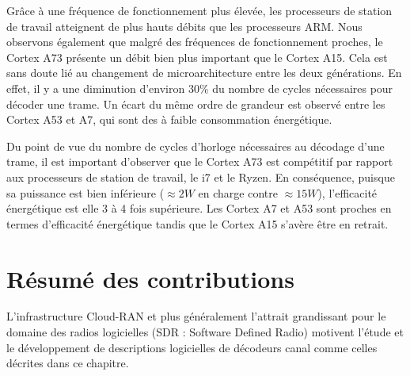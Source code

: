 Grâce à une fréquence de fonctionnement plus élevée, les processeurs de station de travail atteignent de plus hauts débits que les processeurs ARM. Nous observons également que malgré des fréquences de fonctionnement proches, le Cortex A73 présente un débit bien plus important que le Cortex A15. Cela est sans doute lié au changement de microarchitecture entre les deux générations. En effet, il y a une diminution d'environ 30\% du nombre de cycles nécessaires pour décoder une trame. Un écart du même ordre de grandeur est observé entre les Cortex A53 et A7, qui sont des \coeurs à faible consommation énergétique.

Du point de vue du nombre de cycles d'horloge nécessaires au décodage d'une trame, il est important d'observer que le Cortex A73 est compétitif par rapport aux processeurs de station de travail, le i7 et le Ryzen. En conséquence, puisque sa puissance est bien inférieure ($\approx 2 W$ en charge contre $\approx 15 W$), l'efficacité énergétique est elle 3 à 4 fois supérieure. Les Cortex A7 et A53 sont proches en termes d'efficacité énergétique tandis que le Cortex A15 s'avère être en retrait.



\section{Résumé des contributions}
\label{sec:scl_contrib}

L'infrastructure Cloud-RAN et plus généralement l'attrait grandissant pour le domaine des radios logicielles (SDR : Software Defined Radio) motivent l'étude et le développement de descriptions logicielles de décodeurs canal comme celles décrites dans ce chapitre.

